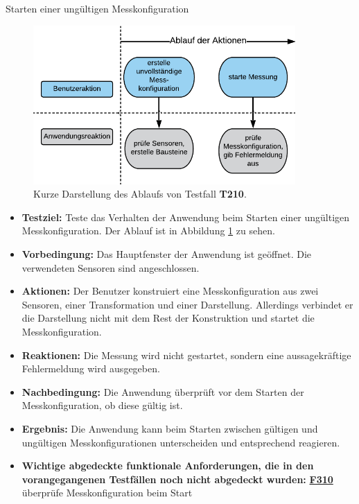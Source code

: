 \documentclass[parskip=full]{scrartcl}
\begin{document}
\begin{description}
\begin{itemize}
\end{itemize}

\hypertarget{link-t210}{\item[T210]} Starten einer ungültigen Messkonfiguration

\begin{figure}[htbp]
	\begin{center}
		\includegraphics[width = 10cm]{Grafik/T210-Ablauf.png}
		\caption{Kurze Darstellung des Ablaufs von Testfall \textbf{T210}.}
		\label{T210-Ablauf}
	\end{center}
\end{figure}
\begin{itemize}

\item []\textbf{Testziel:} Teste das Verhalten der Anwendung beim Starten einer ungültigen Messkonfiguration. Der Ablauf ist in Abbildung \ref{T210-Ablauf} zu sehen.

\item []\textbf{Vorbedingung:} Das Hauptfenster der Anwendung ist geöffnet. Die verwendeten Sensoren sind angeschlossen. 

\item []\textbf{Aktionen:} Der Benutzer konstruiert eine Messkonfiguration aus zwei Sensoren, einer Transformation und einer Darstellung. Allerdings verbindet er die Darstellung nicht mit dem Rest der Konstruktion und startet die Messkonfiguration.
\item []\textbf{Reaktionen:} Die Messung wird nicht gestartet, sondern eine aussagekräftige Fehlermeldung wird ausgegeben.
\item []\textbf{Nachbedingung:} Die Anwendung überprüft vor dem Starten der Messkonfiguration, ob diese gültig ist.

\item []\textbf{Ergebnis:} Die Anwendung kann beim Starten zwischen gültigen und ungültigen Messkonfigurationen unterscheiden und entsprechend reagieren.
\item []\textbf{Wichtige abgedeckte funktionale Anforderungen, die in den vorangegangenen Testfällen noch nicht abgedeckt wurden:} \hyperlink{link-f310}{\textbf{F310}} überprüfe Messkonfiguration beim Start


\end{itemize}
\end{description}
\end{document}
